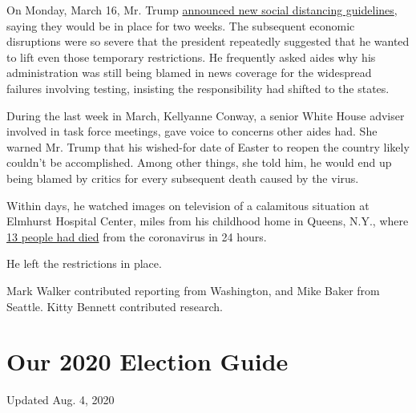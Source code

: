 On Monday, March 16, Mr. Trump
\href{https://www.nytimes3xbfgragh.onion/2020/03/16/us/politics/trump-coronavirus-guidelines.html}{announced
new social distancing guidelines}, saying they would be in place for two
weeks. The subsequent economic disruptions were so severe that the
president repeatedly suggested that he wanted to lift even those
temporary restrictions. He frequently asked aides why his administration
was still being blamed in news coverage for the widespread failures
involving testing, insisting the responsibility had shifted to the
states.

During the last week in March, Kellyanne Conway, a senior White House
adviser involved in task force meetings, gave voice to concerns other
aides had. She warned Mr. Trump that his wished-for date of Easter to
reopen the country likely couldn't be accomplished. Among other things,
she told him, he would end up being blamed by critics for every
subsequent death caused by the virus.

Within days, he watched images on television of a calamitous situation
at Elmhurst Hospital Center, miles from his childhood home in Queens,
N.Y., where
\href{https://www.nytimes3xbfgragh.onion/2020/03/25/nyregion/nyc-coronavirus-hospitals.html}{13
people had died} from the coronavirus in 24 hours.

He left the restrictions in place.

Mark Walker contributed reporting from Washington, and Mike Baker from
Seattle. Kitty Bennett contributed research.

\hypertarget{our-2020-election-guide}{%
\section{Our 2020 Election Guide}\label{our-2020-election-guide}}

Updated Aug. 4, 2020

